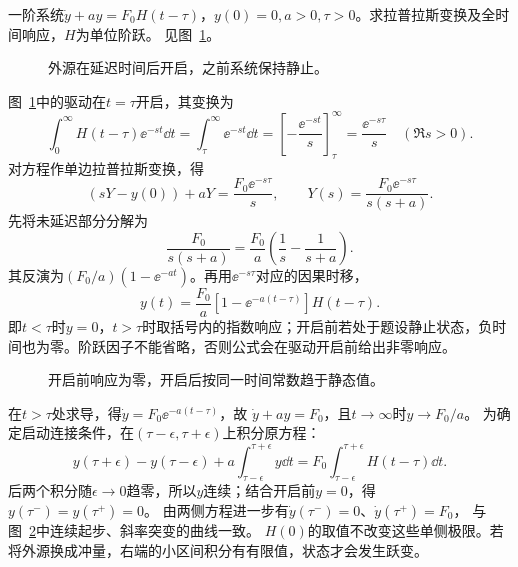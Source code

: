 \begin{exercise}[延迟阶跃的拉普拉斯响应]\label{ex:c4-h11}
一阶系统$\dot y+ay=F_0H(t-\tau)$，$y(0)=0,a>0,\tau>0$。求拉普拉斯变换及全时间响应，$H$为单位阶跃。 见图~\ref{fig:c4-h11-q}。
\end{exercise}

\begin{figure}[H]\centering
{}
\caption{外源在延迟时间后开启，之前系统保持静止。}\label{fig:c4-h11-q}
\end{figure}
\begin{solution}
图~\ref{fig:c4-h11-q}中的驱动在$t=\tau$开启，其变换为
\[\int_0^\infty H(t-\tau)\ee^{-st}\dd t
=\int_\tau^\infty\ee^{-st}\dd t
=\left[-\frac{\ee^{-st}}s\right]_\tau^\infty
=\frac{\ee^{-s\tau}}s\quad(\Re s>0).\]
对方程作单边拉普拉斯变换，得
\[
 (sY-y(0))+aY=\frac{F_0\ee^{-s\tau}}s,\qquad
 \boxed{Y(s)=\frac{F_0\ee^{-s\tau}}{s(s+a)}}.
\]
先将未延迟部分分解为
\[
 \frac{F_0}{s(s+a)}
 =\frac{F_0}{a}\left(\frac1s-\frac1{s+a}\right).
\]
其反演为$(F_0/a)(1-\ee^{-at})$。再用$\ee^{-s\tau}$对应的因果时移，
\[
 \boxed{y(t)=\frac{F_0}{a}
 [1-\ee^{-a(t-\tau)}]H(t-\tau)}.
\]
即$t<\tau$时$y=0$，$t>\tau$时取括号内的指数响应；开启前若处于题设静止状态，负时间也为零。阶跃因子不能省略，否则公式会在驱动开启前给出非零响应。
\begin{figure}[H]\centering
{}
\caption{开启前响应为零，开启后按同一时间常数趋于静态值。}\label{fig:c4-h11-s}
\end{figure}
在$t>\tau$处求导，得$\dot y=F_0\ee^{-a(t-\tau)}$，故
$\dot y+ay=F_0$，且$t\to\infty$时$y\to F_0/a$。
为确定启动连接条件，在$(\tau-\epsilon,\tau+\epsilon)$上积分原方程：
\[
 y(\tau+\epsilon)-y(\tau-\epsilon)
 +a\int_{\tau-\epsilon}^{\tau+\epsilon}y\dd t
 =F_0\int_{\tau-\epsilon}^{\tau+\epsilon}H(t-\tau)\dd t.
\]
后两个积分随$\epsilon\to0$趋零，所以$y$连续；结合开启前$y=0$，得
$y(\tau^-)=y(\tau^+)=0$。
由两侧方程进一步有$\dot y(\tau^-)=0$、$\dot y(\tau^+)=F_0$，
与图~\ref{fig:c4-h11-s}中连续起步、斜率突变的曲线一致。
$H(0)$的取值不改变这些单侧极限。若将外源换成冲量，右端的小区间积分有有限值，状态才会发生跃变。
\end{solution}

